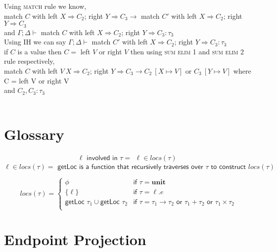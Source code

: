 \documentclass{article}
\begin{document}
Using \textsc{match} rule we know, \\ 
match $C$ with left $X \Rightarrow C_2 $; right $ Y \Rightarrow C_3 \to$
match $C'$ with left $X \Rightarrow C_2 $; right $ Y \Rightarrow C_3$ \\ and $\Gamma;\Delta \vdash$ match $C$ with left $X \Rightarrow C_2 $; right $ Y \Rightarrow C_3 : \tau_3$ \\
Using IH we can say $\Gamma;\Delta \vdash$ match $C'$ with left $X \Rightarrow C_2 $; right $ Y \Rightarrow C_3 : \tau_3$ \\
if $C$ is a value then $C =$ left $V$ or right $V$ then using \textsc{sum elim 1} and \textsc{sum elim 2} rule respectively, \\
match $C$ with left $V \ X \Rightarrow C_2 $; right $ Y \Rightarrow C_3 \to  C_2\ [X \mapsto V] $ or $  C_3\ [Y \mapsto V]$ where C = left V or right V\\
and $C_2, C_3 : \tau_3$ \\\\



\section{Glossary}
$$
\ell \textsf{ involved in } \tau = 
    \begin{array}{l}
    \ell \in locs (\tau)
    \end{array}
$$
$$
 \ell \in locs (\tau) = \textsf{ getLoc is a function that recursively traverses over } \tau \textsf{ to construct } locs (\tau)
$$

$$
 locs (\tau) = \left\{
    \begin{array}{ll}
    \phi & \textsf{if } \tau = \textbf{unit}\\
    \{\ell\} & \textsf{if } \tau = \ell.e\\
        \textsf{getLoc } \tau_1 \cup \textsf{getLoc } \tau_2 & \textsf{if } \tau = \tau_1 \to \tau_2 \textsf{ or } \tau_1 + \tau_2 \textsf{ or } \tau_1 \times \tau_2 \\
    \end{array}
\right.
$$

\section{Endpoint Projection}
\end{document}
